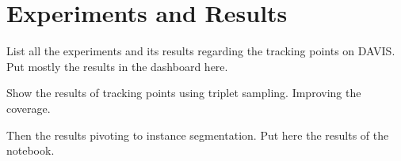 
%
\newpage
\chapter{Experiments and Results}


List all the experiments and its results regarding the tracking points on DAVIS. Put mostly the results in the dashboard here.

Show the results of tracking points using triplet sampling. Improving the coverage.

Then the results pivoting to instance segmentation. Put here the results of the notebook.

